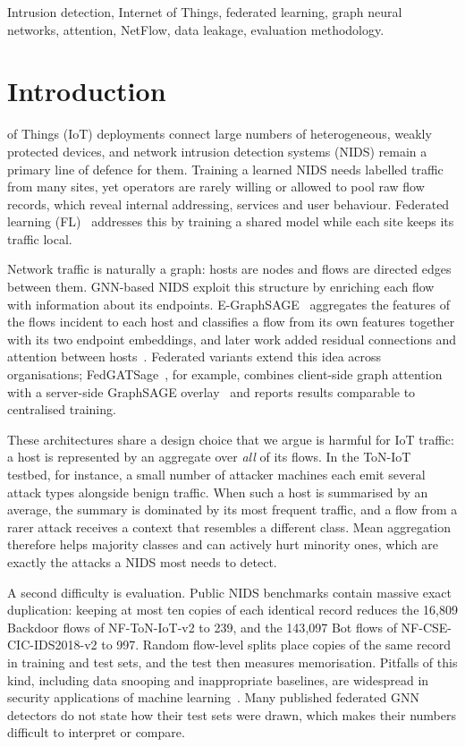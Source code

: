\documentclass[journal]{IEEEtran}
\begin{document}
\begin{IEEEkeywords}
Intrusion detection, Internet of Things, federated learning, graph neural networks, attention, NetFlow, data leakage, evaluation methodology.
\end{IEEEkeywords}

\section{Introduction}
 of Things (IoT) deployments connect large numbers of heterogeneous, weakly protected devices, and network intrusion detection systems (NIDS) remain a primary line of defence for them. Training a learned NIDS needs labelled traffic from many sites, yet operators are rarely willing or allowed to pool raw flow records, which reveal internal addressing, services and user behaviour. Federated learning (FL)~\cite{mcmahan2017fedavg,li2020flchallenges} addresses this by training a shared model while each site keeps its traffic local.

Network traffic is naturally a graph: hosts are nodes and flows are directed edges between them. GNN-based NIDS exploit this structure by enriching each flow with information about its endpoints. E-GraphSAGE~\cite{lo2022egraphsage} aggregates the features of the flows incident to each host and classifies a flow from its own features together with its two endpoint embeddings, and later work added residual connections and attention between hosts~\cite{chang2024eresgat}. Federated variants extend this idea across organisations; FedGATSage~\cite{altfaily2025fedgatsage}, for example, combines client-side graph attention with a server-side GraphSAGE overlay~\cite{hamilton2017graphsage} and reports results comparable to centralised training.

These architectures share a design choice that we argue is harmful for IoT traffic: a host is represented by an aggregate over \emph{all} of its flows. In the ToN-IoT testbed, for instance, a small number of attacker machines each emit several attack types alongside benign traffic. When such a host is summarised by an average, the summary is dominated by its most frequent traffic, and a flow from a rarer attack receives a context that resembles a different class. Mean aggregation therefore helps majority classes and can actively hurt minority ones, which are exactly the attacks a NIDS most needs to detect.

A second difficulty is evaluation. Public NIDS benchmarks contain massive exact duplication: keeping at most ten copies of each identical record reduces the 16{,}809 Backdoor flows of NF-ToN-IoT-v2 to 239, and the 143{,}097 Bot flows of NF-CSE-CIC-IDS2018-v2 to 997. Random flow-level splits place copies of the same record in training and test sets, and the test then measures memorisation. Pitfalls of this kind, including data snooping and inappropriate baselines, are widespread in security applications of machine learning~\cite{arp2022dos}. Many published federated GNN detectors do not state how their test sets were drawn, which makes their numbers difficult to interpret or compare.
\end{document}
